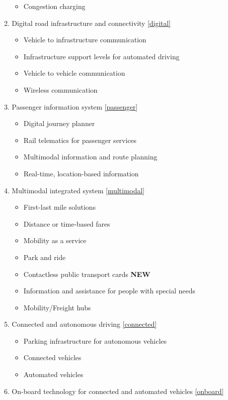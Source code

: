 \documentclass[
]{book}
\providecommand{\tightlist}{%
  \setlength{\itemsep}{0pt}\setlength{\parskip}{0pt}}
\begin{document}
\begin{enumerate}
  \begin{itemize}
  \tightlist
  \item
    Congestion charging
  \end{itemize}
\item
  Digital road infrastructure and connectivity \ref{digital}

  \begin{itemize}
  \tightlist
  \item
    Vehicle to infrastructure communication
  \item
    Infrastructure support levels for automated driving
  \item
    Vehicle to vehicle communication
  \item
    Wireless communication
  \end{itemize}
\item
  Passenger information system \ref{passenger}

  \begin{itemize}
  \tightlist
  \item
    Digital journey planner
  \item
    Rail telematics for passenger services
  \item
    Multimodal information and route planning
  \item
    Real-time, location-based information
  \end{itemize}
\item
  Multimodal integrated system \ref{multimodal}

  \begin{itemize}
  \tightlist
  \item
    First-last mile solutions
  \item
    Distance or time-based fares
  \item
    Mobility as a service
  \item
    Park and ride
  \item
    Contactless public transport cards \textbf{NEW}
  \item
    Information and assistance for people with special needs
  \item
    Mobility/Freight hubs
  \end{itemize}
\item
  Connected and autonomous driving \ref{connected}

  \begin{itemize}
  \tightlist
  \item
    Parking infrastructure for autonomous vehicles
  \item
    Connected vehicles
  \item
    Automated vehicles
  \end{itemize}
\item
  On-board technology for connected and automated vehicles \ref{onboard}


\end{enumerate}
\end{document}
